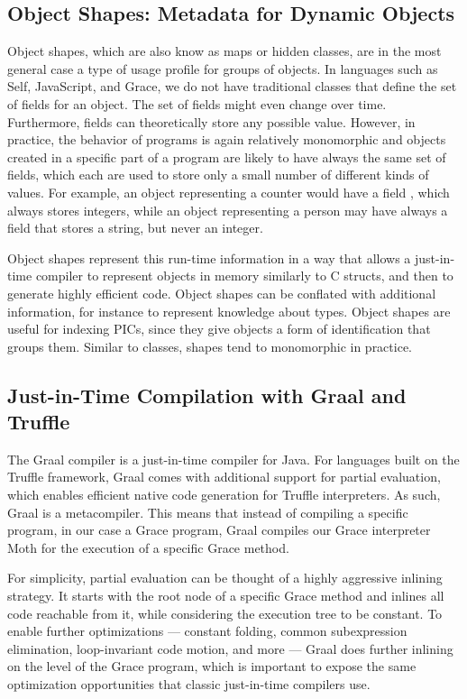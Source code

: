 \subsection{Object Shapes: Metadata for Dynamic Objects}
\label{sec:background-obj-shape}

Object shapes\citep{woss2014object},
which are also know as maps\citep{Self} or hidden classes,
are in the most general case a type of usage profile for groups of objects.
In languages such as Self, JavaScript, and Grace,
we do not have traditional classes that define the set of fields for an object.
The set of fields might even change over time.
Furthermore, fields can theoretically store any possible value.
However, in practice, the behavior of programs is again relatively monomorphic
and objects created in a specific part of a  program are likely
to have always the same set of fields, which each are used to store only
a small number of different kinds of values.
For example, an object representing a counter would have a field ,
which always stores integers,
while an object representing a person may have always a field 
that stores a string, but never an integer.

Object shapes represent this run-time information in a way that allows a
just-in-time compiler to
represent objects in memory similarly to C structs, and then to 
generate highly efficient code.
Object shapes can be conflated with additional information,
for instance to represent knowledge about types\citep{Bauman2017,Richards2017}.
Object shapes are useful for indexing PICs,
since they give objects a form of identification that groups them.
Similar to classes, shapes tend to monomorphic in practice.


\subsection{Just-in-Time Compilation with Graal and Truffle}
\label{sec:background-graal-pe}

The Graal compiler is a just-in-time compiler for Java.
For languages built on the Truffle framework,
Graal comes with  additional support for partial evaluation,
which enables efficient native code generation for
Truffle interpreters\citep{Wurthinger:2017:PPE}. As such, Graal is a metacompiler.
This means that instead of compiling a specific program, in our case a Grace program,
Graal compiles our Grace interpreter Moth for the execution of a specific Grace method.

For simplicity, partial evaluation can be thought of a highly aggressive inlining strategy.
It starts with the root node of a specific Grace method
and inlines all code reachable from it, while considering the execution tree
to be constant.
To enable further optimizations ---%
constant folding, common subexpression elimination, loop-invariant code motion, and more ---%
Graal does further inlining on the level of the Grace program,
which is important to expose the same optimization opportunities that
classic just-in-time compilers use.

